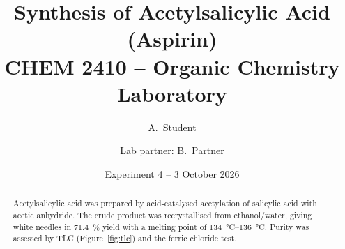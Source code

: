 \documentclass[11pt]{article}
\title{Synthesis of Acetylsalicylic Acid (Aspirin)\\\large CHEM 2410 -- Organic Chemistry Laboratory}
\author{A.~Student \and Lab partner: B.~Partner}
\date{Experiment 4 -- 3 October 2026}
\begin{document}
\maketitle

\begin{abstract}
Acetylsalicylic acid was prepared by acid-catalysed acetylation of salicylic
acid with acetic anhydride. The crude product was recrystallised from
ethanol/water, giving white needles in \SI{71.4}{\percent} yield with a melting
point of \SIrange{134}{136}{\celsius}. Purity was assessed by TLC
(Figure~\ref{fig:tlc}) and the ferric chloride test.
\end{abstract}








\end{document}

